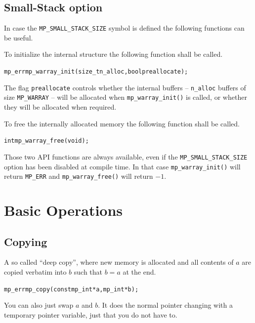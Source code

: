 \documentclass[synpaper]{book}
\begin{document}
\section{Small-Stack option}
\label{ch:SMALL_STACK_API}

In case the \texttt{MP\_SMALL\_STACK\_SIZE} symbol is defined the following functions
can be useful.

To initialize the internal structure the following function shall be called.

\begin{alltt}
mp_err mp_warray_init(size_t n_alloc, bool preallocate);
\end{alltt}

The flag \texttt{preallocate} controls whether the internal buffers --
\texttt{n\_alloc} buffers of size \texttt{MP\_WARRAY} -- will be allocated when
\texttt{mp\_warray\_init()} is called, or whether they will be allocated when required.

To free the internally allocated memory the following function shall be called.

\begin{alltt}
int mp_warray_free(void);
\end{alltt}


Those two API functions are always available, even if the \texttt{MP\_SMALL\_STACK\_SIZE} option
has been disabled at compile time.
In that case \texttt{mp\_warray\_init()} will return \texttt{MP\_ERR} and \texttt{mp\_warray\_free()}
will return $-1$.


\chapter{Basic Operations}
\section{Copying}

A so called ``deep copy'', where new memory is allocated and all contents of $a$ are copied
verbatim into $b$ such that $b = a$ at the end.

\begin{alltt}
mp_err mp_copy (const mp_int *a, mp_int *b);
\end{alltt}

You can also just swap $a$ and $b$. It does the normal pointer changing with a temporary pointer
variable, just that you do not have to.
\end{document}
